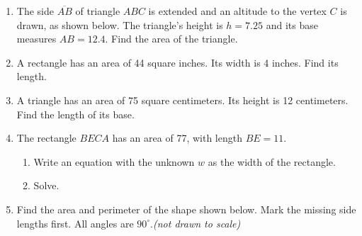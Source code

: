 \begin{enumerate}
\item The side $\overline{AB}$ of triangle $ABC$ is extended and an altitude to the vertex $C$ is drawn, as shown below. The triangle's height is $h=7.25$ and its base measures $AB=12.4$. Find the area of the triangle.\\[0.25cm]

\item A rectangle has an area of 44 square inches. Its width is 4 inches. Find its length.
\vspace{2.0cm}

\item A triangle has an area of 75 square centimeters. Its height is 12 centimeters. Find the length of its base.
   
\item The rectangle $BECA$ has an area of 77, with length $BE=11$.
  \begin{enumerate}
    \item Write an equation with the unknown $w$ as the width of the rectangle. 
    \item Solve.
  \end{enumerate}
  \begin{flushright}
  \end{flushright}


\item Find the area and perimeter of the shape shown below. Mark the missing side lengths first. All angles are $90^\circ$.\hfill \emph{(not drawn to scale)}
\begin{flushleft}
\end{flushleft} \vspace{1cm}


\end{enumerate}
